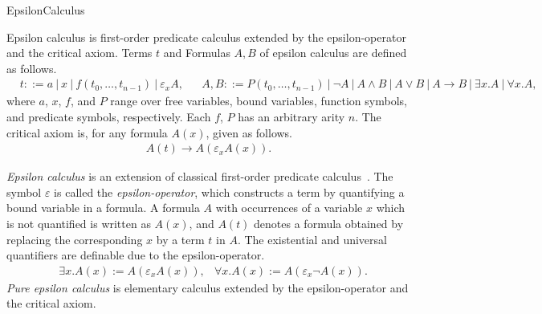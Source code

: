 \begin{entry}{EpsilonCalculus}  


\begin{calculus}

Epsilon calculus is first-order predicate calculus extended by the
epsilon-operator and the critical axiom.  Terms $t$ and Formulas $A,
B$ of epsilon calculus are defined as follows.
\begin{align*}
  & t ::= a ~|~ x ~|~ f(t_0, \ldots, t_{n-1}) ~|~ \varepsilon_x A, 
  && A, B ::= P(t_0, \ldots, t_{n-1}) ~|~ \neg A ~|~ A \land B ~|~ A \lor B ~|~ A \to B ~|~ \exists x. A ~|~ \forall x. A,
\end{align*}
where $a$, $x$, $f$, and $P$ range over free variables, bound
variables, function symbols, and predicate symbols, respectively.
Each $f$, $P$ has an arbitrary arity $n$.
The critical axiom is, for any formula $A(x)$, given as follows.
\begin{align*}
  A(t) \to A(\varepsilon_xA(x)).
\end{align*}
\end{calculus}

\begin{clarifications}
  \emph{Epsilon calculus} is an extension of classical first-order
  predicate
  calculus~\cite{HilbertBernays1939,MoserZach06,AvigadZach13}.  The
  symbol $\varepsilon$ is called the \emph{epsilon-operator}, which
  constructs a term by quantifying a bound variable in a formula.  A
  formula $A$ with occurrences of a variable $x$ which is not
  quantified is written as $A(x)$, and $A(t)$ denotes a formula
  obtained by replacing the corresponding $x$ by a term $t$ in $A$.
  The existential and universal quantifiers are definable due to the
  epsilon-operator.
\begin{align*}
  & \exists x. A(x) := A(\varepsilon_x A(x)), & \forall x. A(x) := A(\varepsilon_x \neg A(x)).
\end{align*}
\emph{Pure epsilon calculus} is elementary calculus extended by the
epsilon-operator and the critical axiom.

\end{clarifications}



\end{entry}
